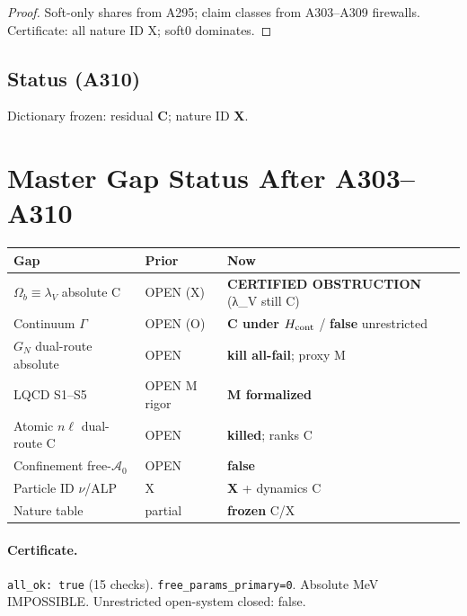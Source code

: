 \begin{proof}
Soft-only shares from A295; claim classes from A303--A309 firewalls. Certificate: all nature ID X; soft0 dominates.
\end{proof}

\subsection*{Status (A310)}
Dictionary frozen: residual \textbf{C}; nature ID \textbf{X}.

\section*{Master Gap Status After A303--A310}
\begin{center}
\begin{tabular}{@{}p{4.2cm}p{3.2cm}p{5.0cm}@{}}
\toprule
Gap & Prior & Now \\
\midrule
$\Omega_b\equiv\lambda_V$ absolute C & OPEN (X) & \textbf{CERTIFIED OBSTRUCTION} (λ\_V still C) \\
Continuum $\Gamma$ & OPEN (O) & \textbf{C under $H_{\rm cont}$} / \textbf{false} unrestricted \\
$G_N$ dual-route absolute & OPEN & \textbf{kill all-fail}; proxy M \\
LQCD S1--S5 & OPEN M rigor & \textbf{M formalized} \\
Atomic $n\ell$ dual-route C & OPEN & \textbf{killed}; ranks C \\
Confinement free-$\mathcal{A}_0$ & OPEN & \textbf{false} \\
Particle ID $\nu$/ALP & X & \textbf{X} + dynamics C \\
Nature table & partial & \textbf{frozen} C/X \\
\bottomrule
\end{tabular}
\end{center}

\paragraph{Certificate.}
\texttt{all\_ok: true} (15 checks). \texttt{free\_params\_primary=0}. Absolute MeV IMPOSSIBLE.
Unrestricted open-system closed: false.
